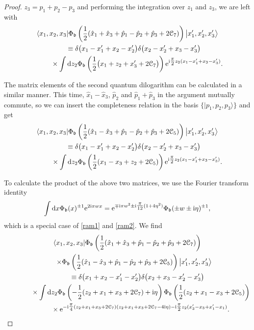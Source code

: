 \documentclass[pdftex]{sigma}
\newcommand{\bb}{{\mathfrak b}}
\newcommand{\e}{{\mathrm e}}
\numberwithin{equation}{section}
\begin{document}
\begin{proof}
 $z_3 = p_1 + p_2 - p_3$ and performing the integration over $z_1$
 and $z_3$, we are left with
 \begin{gather*}
 \langle x_1, x_2, x_3|
 \Phi_\bb\left(\frac{1}{2}(\hat{x}_1 + \hat{x}_3 + \hat{p}_1 - \hat{p}_2 + \hat{p}_3 +2\mathcal{C}_7)\right)
 \bigl|x'_1, x'_2, x'_3 \bigr\rangle
 \\
 \qquad\equiv
 \delta\bigl(x_1 - x'_1 + x_2 - x'_2\bigr) \delta\bigl(x_2 - x'_2 + x_3 - x'_3\bigr)\\
 \phantom{ \qquad\equiv}{}\times
 \int {\rm d}z_2 \Phi_\bb\left(\frac{1}{2}\bigl(x_1 + z_2 + x'_3 +2\mathcal{C}_7\bigr)\right)
 \e^{{\rm i} \tfrac{\pi}{2} z_2(x_1 - x'_1 + x_3 - x'_3)}.
 \end{gather*}

 The matrix elements of the second quantum dilogarithm can be
 calculated in a similar manner. This time, $\hat{x}_1 - \hat{x}_3$,
 $\hat{p}_2$ and $\hat{p}_1 + \hat{p}_3$ in the argument mutually
 commute, so we can insert the completeness relation in the basis
 $\{|p_1, p_2, p_3 \rangle\}$ and get
 \begin{gather*}
 \langle x_1, x_2, x_3|
 \Phi_\bb\left(\frac{1}{2}(\hat{x}_1 - \hat{x}_3
 + \hat{p}_1 - \hat{p}_2 + \hat{p}_3 +2\mathcal{C}_5)\right)
 \bigl|x'_1, x'_2, x'_3 \bigr\rangle
 \\
 \qquad \equiv
 \delta\bigl(x_1 - x'_1 + x_2 - x'_2\bigr) \delta\bigl(x_2 - x'_2 + x_3 - x'_3\bigr)\\
 \phantom{ \qquad\equiv}{}\times
 \int {\rm d}z_2 \Phi_\bb\left(\frac{1}{2}(x_1 - x_3 + z_2 + 2\mathcal{C}_5)\right)
 \e^{{\rm i}\tfrac{\pi}{2} z_2(x_1 - x'_1 + x_3 - x'_3)}.
 \end{gather*}

 To calculate the product of the above two matrices, we use the
 Fourier transform identity
 \[
 \int {\rm d}x \Phi_\bb(x)^{\pm1}\e^{2{\rm i}\pi wx}
 =
 \e^{\mp {\rm i}\pi w^2 \pm {\rm i} \tfrac{\pi}{12} (1+4\eta^{2})}
 \Phi_\bb(\pm w\pm {\rm i}\eta)^{\pm1},
 \]
 which is a special case of \eqref{ram1} and \eqref{ram2}.
 We find
 \begin{gather*}
 \langle x_1, x_2, x_3|\Phi_\bb\left(\frac{1}{2}(\hat{x}_1 + \hat{x}_3 + \hat{p}_1 - \hat{p}_2 + \hat{p}_3 +2\mathcal{C}_7)\right)\\
 \qquad
 \times \Phi_\bb\left(\frac{1}{2}(\hat{x}_1 - \hat{x}_3 + \hat{p}_1 - \hat{p}_2 + \hat{p}_3 +2\mathcal{C}_5)\right)\bigl|x'_1, x'_2, x'_3 \bigr\rangle
 \\
 \phantom{ \qquad
 \times }{}\equiv
 \delta\bigl(x_1 + x_2 -x'_1 - x'_2\bigr) \delta\bigl(x_2 + x_3 -x'_2 - x'_3\bigr)
 \\
 \phantom{ \qquad\times\equiv}{} \times
 \int {\rm d}z_2
 \Phi_\bb\left(-\frac{1}{2}(z_2 + x_1 + x_3 + 2\mathcal{C}_7)+{\rm i}\eta\right) \Phi_\bb\left(\frac{1}{2}(z_2 + x_1 - x_3 + 2\mathcal{C}_5)\right)
 \\
 \phantom{ \qquad\times\equiv}{} \times
 \e^{-{\rm i} \tfrac{\pi}{4} (z_2+x_1+x_3+2\mathcal{C}_7)(z_2+x_1+x_3+2\mathcal{C}_7-4{\rm i}\eta)
 - {\rm i} \tfrac{\pi}{2} z_2(x'_3-x_3+x'_1-x_1)}.
 \end{gather*}


\end{proof}
\end{document}
